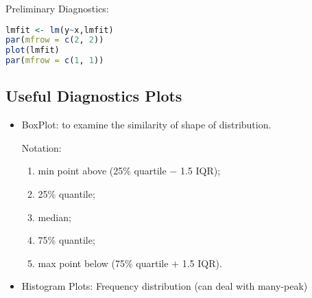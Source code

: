     \noindent Preliminary Diagnostics:

\begin{rcode}
\begin{lstlisting}[language=R]
lmfit <- lm(y~x,lmfit)
par(mfrow = c(2, 2))
plot(lmfit)
par(mfrow = c(1, 1))
\end{lstlisting}
\end{rcode}
    

\subsection{Useful Diagnostics Plots}

       \begin{itemize}[topsep=2pt,itemsep=0pt]
            \item BoxPlot: to examine the similarity of shape of distribution.
            
            Notation:
            \begin{enumerate}[topsep=2pt,itemsep=0pt]
                \item min point above (25\% quartile $ - $ 1.5 IQR);
                \item 25\% quantile;
                \item median;
                \item 75\% quantile;
                \item max point below (75\% quartile $ + $ 1.5 IQR).
            \end{enumerate}
            
                
            \begin{center}
            \end{center}


    
            

        \item Histogram Plots: Frequency distribution (can deal with many-peak)
            

\end{itemize}
